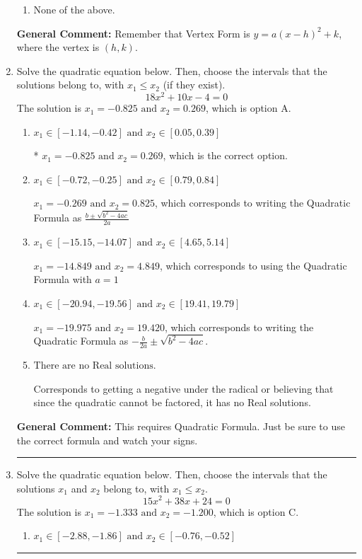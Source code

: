 \documentclass{extbook}[14pt]
\newcommand{\litem}[1]{\item #1

\rule{\textwidth}{0.4pt}}
\begin{document}
\begin{enumerate}
{\begin{enumerate}[label=\Alph*.]
\begin{multicols}{2}
\end{multicols}\item None of the above.\end{enumerate}
\textbf{General Comment:} Remember that Vertex Form is $y = a(x-h)^2+k$, where the vertex is $(h, k)$.
}
\litem{
Solve the quadratic equation below. Then, choose the intervals that the solutions belong to, with $x_1 \leq x_2$ (if they exist).
\[ 18x^{2} +10 x -4 = 0 \]The solution is \( x_1 = -0.825 \text{ and } x_2 = 0.269 \), which is option A.\begin{enumerate}[label=\Alph*.]
\item \( x_1 \in [-1.14, -0.42] \text{ and } x_2 \in [0.05, 0.39] \)

* $x_1 = -0.825 \text{ and } x_2 = 0.269$, which is the correct option.
\item \( x_1 \in [-0.72, -0.25] \text{ and } x_2 \in [0.79, 0.84] \)

 $x_1 = -0.269 \text{ and } x_2 = 0.825$, which corresponds to writing the Quadratic Formula as $\frac{b \pm \sqrt{b^2 - 4ac}}{2a}$
\item \( x_1 \in [-15.15, -14.07] \text{ and } x_2 \in [4.65, 5.14] \)

 $x_1 = -14.849 \text{ and } x_2 = 4.849$, which corresponds to using the Quadratic Formula with $a=1$
\item \( x_1 \in [-20.94, -19.56] \text{ and } x_2 \in [19.41, 19.79] \)

 $x_1 = -19.975 \text{ and } x_2 = 19.420$, which corresponds to writing the Quadratic Formula as $-\frac{b}{2a} \pm \sqrt{b^2 - 4ac}$.
\item \( \text{There are no Real solutions.} \)

Corresponds to getting a negative under the radical or believing that since the quadratic cannot be factored, it has no Real solutions.
\end{enumerate}

\textbf{General Comment:} This requires Quadratic Formula. Just be sure to use the correct formula and watch your signs.
}
\litem{
Solve the quadratic equation below. Then, choose the intervals that the solutions $x_1$ and $x_2$ belong to, with $x_1 \leq x_2$.
\[ 15x^{2} +38 x + 24 = 0 \]The solution is \( x_1 = -1.333 \text{ and } x_2 = -1.200 \), which is option C.\begin{enumerate}[label=\Alph*.]
\item \( x_1 \in [-2.88, -1.86] \text{ and } x_2 \in [-0.76, -0.52] \)


\end{enumerate}}
\end{enumerate}
\end{document}

